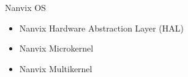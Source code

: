 		\begin{frame}[fragile]{Nanvix OS}



			\begin{itemize}
				\item Nanvix Hardware Abstraction Layer (HAL)
				\item Nanvix Microkernel
				\item Nanvix Multikernel
			\end{itemize}

		\end{frame}

